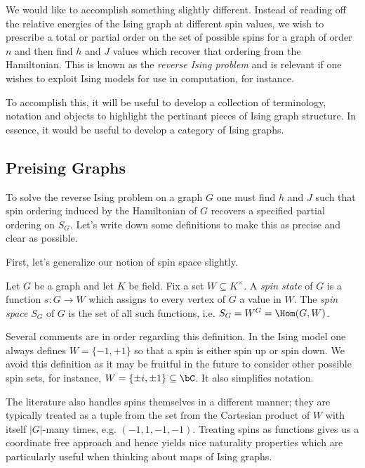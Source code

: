 We would like to accomplish something slightly different. Instead of reading off the relative energies of the Ising graph at different spin values, we wish to prescribe a total or partial order on the set of possible spins for a graph of order $n$ and then find $h$ and $J$ values which recover that ordering from the Hamiltonian. This is known as the \emph{reverse Ising problem} and is relevant if one wishes to exploit Ising models for use in computation, for instance.

To accomplish this, it will be useful to develop a collection of terminology, notation and objects to highlight the pertinant pieces of Ising graph structure. In essence, it would be useful to develop a category of Ising graphs.

\bigskip

\subsection{Preising Graphs}
To solve the reverse Ising problem on a graph $G$ one must find $h$ and $J$ such that spin ordering induced by the Hamiltonian of $G$ recovers a specified partial ordering on $S_G$. Let's write down some definitions to make this as precise and clear as possible.

First, let's generalize our notion of spin space slightly.
\begin{defn}\label{defn:spin-space}
	Let $G$ be a graph and let $K$ be field. Fix a set $W \subseteq K^\times$. A \emph{spin state} of $G$ is a function $s:G \to W$ which assigns to every vertex of $G$ a value in $W$. The \emph{spin space} $S_G$ of $G$ is the set of all such functions, i.e. $S_G = W^{G} = \Hom(G,W)$.
\end{defn}
\begin{rmk}\label{rmk:spin-clarification}
	Several comments are in order regarding this definition. In the Ising model one always defines $W = \{-1,+1\}$ so that a spin is either spin up or spin down. We avoid this definition as it may be fruitful in the future to consider other possible spin sets, for instance, $W = \{\pm i,\pm 1\} \subseteq \bC$. It also simplifies notation.

	The literature also handles spins themselves in a different manner; they are typically treated as a tuple from the set from the Cartesian product of $W$ with itself $|G|$-many times, e.g. $(-1,1,-1,-1)$. Treating spins as functions gives us a coordinate free approach and hence yields nice naturality properties which are particularly useful when thinking about maps of Ising graphs.
\end{rmk}

